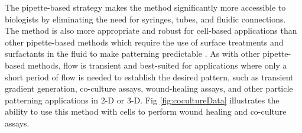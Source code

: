 
The pipette-based strategy makes the method significantly more accessible to biologists by eliminating the need for syringes, tubes, and fluidic connections. The method is also more appropriate and robust for cell-based applications than other pipette-based methods which require the use of surface treatments and surfactants in the fluid to make patterning predictable \cite{Kim:2005fk}. As with other pipette-based methods, flow is transient and best-suited for applications where only a short period of flow is needed to establish the desired pattern, such as transient gradient generation, co-culture assays, wound-healing assays, and other particle patterning applications in 2-D or 3-D. Fig \ref{fig:cocultureData} illustrates the ability to use this method with cells to perform wound healing and co-culture assays.






